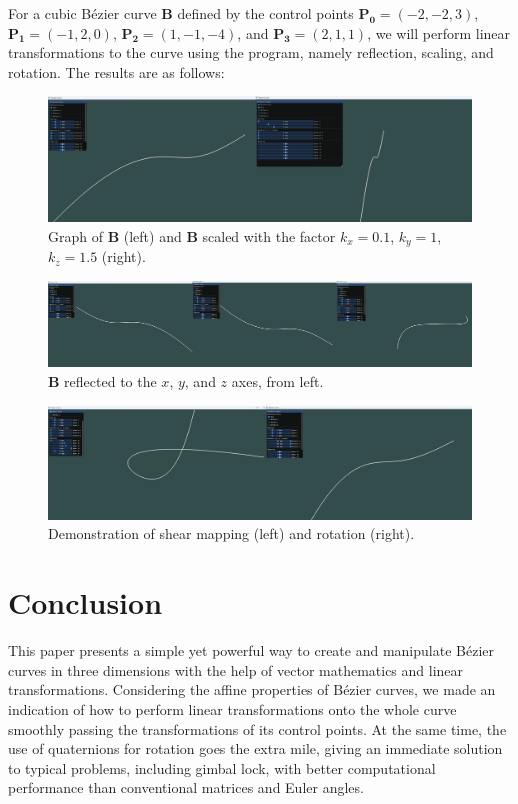 \documentclass[conference]{IEEEtran}
\begin{document}
For a cubic Bézier curve $\mathbf{B}$ defined by the control points $\mathbf{P_0} = (-2, -2, 3)$, $\mathbf{P_1} = (-1, 2, 0)$, $\mathbf{P_2} = (1, -1, -4)$, and $\mathbf{P_3} = (2, 1, 1)$, we will perform linear transformations to the curve using the program, namely reflection, scaling, and rotation. The results are as follows:
\begin{figure}[htb!]
    \centering
    \includegraphics[width=1\linewidth]{tc1.png}
    \caption{Graph of $\mathbf{B}$ (left) and $\mathbf{B}$ scaled with the factor $k_x = 0.1$, $k_y = 1$, $k_z = 1.5$ (right).}
\end{figure}
\begin{figure}[htb!]
    \centering
    \includegraphics[width=1\linewidth]{tc2.png}
    \caption{$\mathbf{B}$ reflected to the $x$, $y$, and $z$ axes, from left.}
\end{figure}
\begin{figure}[htb!]
    \centering
    \includegraphics[width=1\linewidth]{tc3.png}
    \caption{Demonstration of shear mapping (left) and rotation (right).}
\end{figure}
\section{Conclusion}
This paper presents a simple yet powerful way to create and manipulate Bézier curves in three dimensions with the help of vector mathematics and linear transformations. Considering the affine properties of Bézier curves, we made an indication of how to perform linear transformations onto the whole curve smoothly passing the transformations of its control points. At the same time, the use of quaternions for rotation goes the extra mile, giving an immediate solution to typical problems, including gimbal lock, with better computational performance than conventional matrices and Euler angles.
\end{document}
